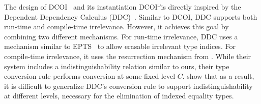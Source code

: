 \documentclass[acmsmall, screen=true, nonacm=true,
  review=\ifpublic false\else true\fi,
  anonymous=\ifanonymous true\else false\fi
]{acmart}
\makeatletter
\newcommand{\dcoi}{DCOI\@\xspace}
\newcommand{\name}{\texorpdfstring{DCOI$^{\omega}$\@\xspace}{DCOI-omega}}
\makeatother
\begin{document}
The design of \dcoi~\citep{liu:dcoi} and its instantiation \name is
directly inspired by the Dependent Dependency Calculus
(DDC)~\citep{choudhury:ddc}. Similar to \dcoi,
DDC supports both run-time and compile-time irrelevance. However, it achieves
this goal by combining two different mechanisms.
For run-time irrelevance, DDC uses a mechanism similar to
EPTS~\citep{mishra:erasure} to allow erasable irrelevant type indices.
For compile-time irrelevance, it uses the resurrection mechanism from
\citet{pfenning:modal, abel:irrelevance}.
While their system includes a indistinguishability relation
similar to ours, their type
conversion rule performs conversion at some fixed level
$C$. \citet{liu:dcoi} show that as a result,
it is difficult to generalize DDC's conversion rule to support
indistinguishability at different levels, necessary for
the elimination of indexed equality types.


\end{document}
